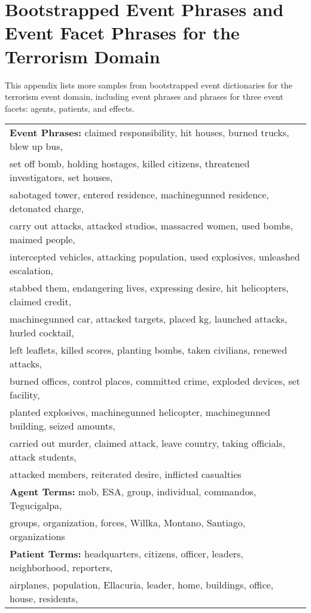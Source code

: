 \chapter{Bootstrapped Event Phrases and Event Facet Phrases for the Terrorism Domain}
\label{Appendix:FacetPhraseForTer}
This appendix lists more samples from bootstrapped event dictionaries for the terrorism event domain, 
including event phrases and phrases for three event facets: agents, patients, and effects. 


\begin{table}[htbp]
\small
\centering
\begin{tabular}[center]{|l|} \hline
{\bf Event Phrases:} claimed responsibility, hit houses, burned trucks, blew up bus, \\
set off bomb, holding hostages, killed citizens, threatened investigators, set houses, \\
sabotaged tower, entered residence, machinegunned residence, detonated charge,\\  
carry out attacks, attacked studios, massacred women, used bombs, maimed people, \\
intercepted vehicles, attacking population, used explosives, unleashed escalation, \\
stabbed them, endangering lives, expressing desire, hit helicopters, claimed credit, \\
machinegunned car, attacked targets, placed kg, launched attacks, hurled cocktail, \\
left leaflets, killed scores, planting bombs, taken civilians, renewed attacks, \\
burned offices, control places, committed crime, exploded devices, set facility, \\
planted explosives, machinegunned helicopter, machinegunned building, seized amounts, \\
carried out murder, claimed attack, leave country, taking officials, attack students, \\
attacked members, reiterated desire, inflicted casualties \\
\hline
{\bf Agent Terms:} mob, ESA, group, individual,  commandos, Tegucigalpa,  \\ 
groups, organization, forces, Willka, Montano, Santiago, organizations\\ 
\hline
 {\bf Patient Terms:} headquarters, citizens, officer, leaders, neighborhood, reporters, \\ 
 airplanes, population, Ellacuria, leader, home, buildings, office, house, residents, \\

\end{tabular}
\end{table}
